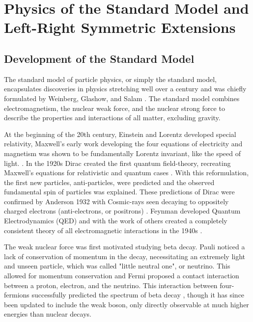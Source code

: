 \chapter{Physics of the Standard Model and Left-Right Symmetric Extensions}
\label{ch:theory}

\section{Development of the Standard Model}

The standard model of particle physics, or simply the standard model, encapsulates discoveries in physics stretching well over a century and was chiefly formulated by Weinberg, Glashow, and Salam \cite{PhysRevLett.19.1264}\cite{nla.cat-vn956113}.  The standard model combines electromagnetism, the nuclear weak force, and the nuclear strong force to describe the properties and interactions of all matter, excluding gravity.

At the beginning of the 20th century, Einstein and Lorentz developed special relativity, Maxwell's early work developing the four equations of electricity and magnetism was shown to be fundamentally Lorentz invariant, like the speed of light. \cite{1898KNAB1427L}\cite{doi:10.1002/andp.19053221004}.  In the 1920s Dirac created the first quantum field-theory, recreating Maxwell's equations for relativistic and quantum cases \cite{doi:10.1098/rspa.1928.0023}.  With this reformulation, the first new particles, anti-particles, were predicted and the observed fundamental spin of particles was explained.  These predictions of Dirac were confirmed by Anderson 1932 with Cosmic-rays seen decaying to oppositely charged electrons (anti-electrons, or positrons) \cite{PhysRev.43.491}.  Feynman developed Quantum Electrodynamics (QED) and with the work of others created a completely consistent theory of all electromagnetic interactions in the 1940s \cite{PhysRev.76.769}.

The weak nuclear force was first motivated studying beta decay.  Pauli noticed a lack of conservation of momentum in the decay, necessitating an extremely light and unseen particle, which was called "little neutral one", or neutrino.  This allowed for momentum conservation and Fermi proposed a contact interaction between a proton, electron, and the neutrino.  This interaction between four-fermions successfully predicted the spectrum of beta decay \cite{Fermi1934}, though it has since been updated to include the weak boson, only directly observable at much higher energies than nuclear decays.

